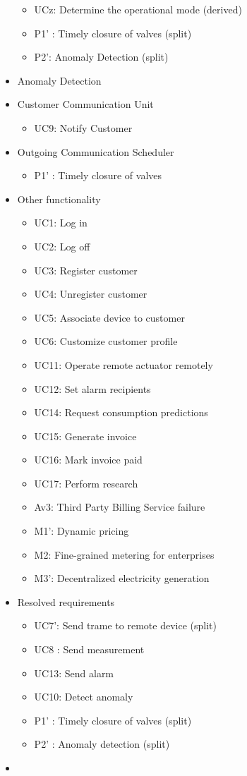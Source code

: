 \begin{itemize}
	\begin{itemize}
		\item UCz: Determine the operational mode (derived)
		\item P1' : Timely closure of valves (split)
	  	\item P2': Anomaly Detection (split)
	\end{itemize}
	\item Anomaly Detection
	\item Customer Communication Unit
	\begin{itemize}
		\item UC9: Notify Customer
	\end{itemize}
	\item Outgoing Communication Scheduler
	\begin{itemize}
	  \item P1' : Timely closure of valves
	\end{itemize}
	\item Other functionality
	\begin{itemize}
	  	\item UC1: Log in
	  	\item UC2: Log off
	  	\item UC3: Register customer
	  	\item UC4: Unregister customer
	  	\item UC5: Associate device to customer
	  	\item UC6: Customize customer profile
	  	\item UC11: Operate remote actuator remotely
	  	\item UC12: Set alarm recipients
	  	\item UC14: Request consumption predictions
	  	\item UC15: Generate invoice
	  	\item UC16: Mark invoice paid
	  	\item UC17: Perform research
	  	\item Av3: Third Party Billing Service failure
	  	\item M1': Dynamic pricing
	  	\item M2: Fine-grained metering for enterprises
	  	\item M3': Decentralized electricity generation
	\end{itemize}
	\item Resolved requirements
	\begin{itemize}
		\item UC7': Send trame to remote device (split)
		\item UC8 : Send measurement
		\item UC13: Send alarm
		\item UC10: Detect anomaly
		\item P1' : Timely closure of valves (split)
		\item P2' : Anomaly detection (split)
	\end{itemize}
	\item 
\end{itemize}
